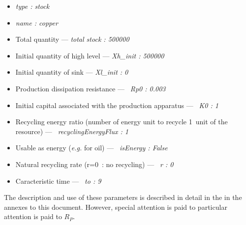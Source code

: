 \documentclass[12pt,a4paper]{article}%
\begin{document}
\begin{itemize}
\item \textit{type : stock}

\item \textit{name : copper}

\item Total quantity --- \textit{total stock : 500000}

\item Initial quantity of high level --- \textit{Xh\_init : 500000}

\item Initial quantity of sink --- \textit{Xl\_init : 0}

\item Production dissipation resistance --- \textit{\ Rp0 : 0.003}

\item Initial capital associated with the
production apparatus --- \textit{\ K0 : 1}

\item Recycling energy ratio (number of energy  unit to recycle 1~unit of the resource) --- \textit{\ recyclingEnergyFlux : 1}

\item Usable as energy (\textit{e.g.} for oil) --- \textit{\ isEnergy : False}

\item Natural recycling rate (r=0~: no recycling) --- \textit{\ r : 0}

\item Caracteristic time --- \textit{\ to : 9}
\end{itemize}

The description and use of these parameters is described in detail in the
in the annexes to this document. However, special attention is paid to
particular attention is paid to $R_{P}$.
\end{document}
